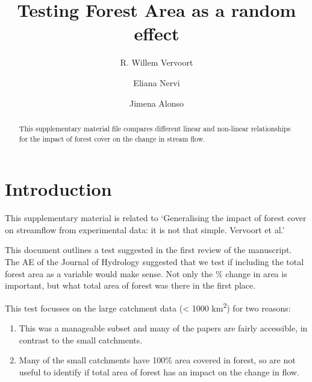 \documentclass[]{elsarticle} %
\providecommand{\tightlist}{%
  \setlength{\itemsep}{0pt}\setlength{\parskip}{0pt}}
\begin{document}
\begin{frontmatter}

  \title{Testing Forest Area as a random effect}
    \author[]{R. Willem Vervoort%
  }
    \author[]{Eliana Nervi}
    \author[]{Jimena Alonso}
  
  \begin{abstract}
  This supplementary material file compares different linear and non-linear relationships for the impact of forest cover on the change in stream flow.
  \end{abstract}
  
 \end{frontmatter}

\setcounter{table}{0} \renewcommand{\thetable}{S\arabic{table}} \setcounter{figure}{0} \renewcommand{\thefigure}{S\arabic{figure}}\setcounter{equation}{0} \renewcommand{\theequation}{S\arabic{equation}}

\hypertarget{introduction}{%
\section{Introduction}\label{introduction}}

This supplementary material is related to `Generalising the impact of forest cover on streamflow from experimental data: it is not that simple. Vervoort et al.'

This document outlines a test suggested in the first review of the manuscript. The AE of the Journal of Hydrology suggested that we test if including the total forest area as a variable would make sense. Not only the \% change in area is important, but what total area of forest was there in the first place.

This test focusses on the large catchment data (\textless{} 1000 km\textsuperscript{2}) for two reasons:

\begin{enumerate}
\def\labelenumi{\arabic{enumi}.}
\tightlist
\item
  This was a manageable subset and many of the papers are fairly accessible, in contrast to the small catchments.
\item
  Many of the small catchments have 100\% area covered in forest, so are not useful to identify if total area of forest has an impact on the change in flow.
\end{enumerate}
\end{document}
